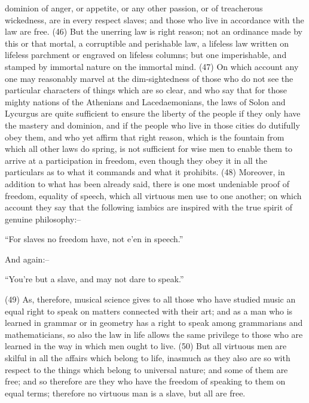 dominion of anger, or appetite, or any other passion, or of treacherous wickedness, are in every
respect slaves; and those who live in accordance with the law are free. (46) But the unerring law is
right reason; not an ordinance made by this or that mortal, a corruptible and perishable law, a
lifeless law written on lifeless parchment or engraved on lifeless columns; but one imperishable,
and stamped by immortal nature on the immortal mind. (47) On which account any one may
reasonably marvel at the dim-sightedness of those who do not see the particular characters of
things which are so clear, and who say that for those mighty nations of the Athenians and
Lacedaemonians, the laws of Solon and Lycurgus are quite sufficient to ensure the liberty of the
people if they only have the mastery and dominion, and if the people who live in those cities do
dutifully obey them, and who yet affirm that right reason, which is the fountain from which all other
laws do spring, is not sufficient for wise men to enable them to arrive at a participation in freedom,
even though they obey it in all the particulars as to what it commands and what it prohibits. (48)
Moreover, in addition to what has been already said, there is one most undeniable proof of
freedom, equality of speech, which all virtuous men use to one another; on which account they say
that the following iambics are inspired with the true spirit of genuine philosophy:--

``For slaves no freedom have, not e'en in speech.''

And again:--

``You're but a slave, and may not dare to speak.''

(49) As, therefore, musical science gives to all those who have studied music an equal right to
speak on matters connected with their art; and as a man who is learned in grammar or in geometry
has a right to speak among grammarians and mathematicians, so also the law in life allows the
same privilege to those who are learned in the way in which men ought to live. (50) But all virtuous
men are skilful in all the affairs which belong to life, inasmuch as they also are so with respect to
the things which belong to universal nature; and some of them are free; and so therefore are they
who have the freedom of speaking to them on equal terms; therefore no virtuous man is a slave,
but all are free.

